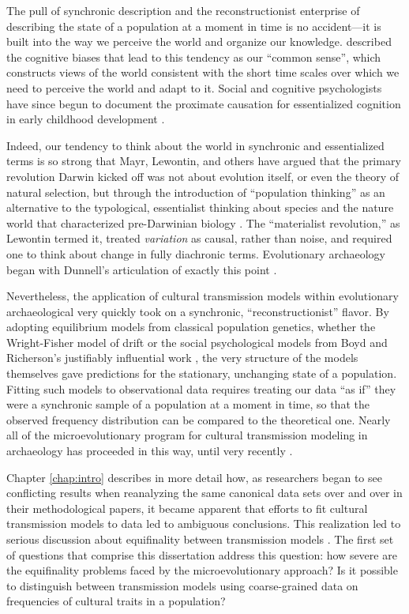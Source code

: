 The pull of synchronic description and the reconstructionist enterprise of describing the state of a population at a moment in time is no accident---it is built into the way we perceive the world and organize our knowledge.   \citet{dunnell1982harvey} described the cognitive biases that lead to this tendency as our ``common sense'', which constructs views of the world consistent with the short time scales over which we need to perceive the world and adapt to it.  Social and cognitive psychologists have since begun to document the proximate causation for essentialized cognition in early childhood development .  

Indeed, our tendency to think about the world in synchronic and essentialized terms is so strong that Mayr, Lewontin, and others have argued that the primary revolution Darwin kicked off was not about evolution itself, or even the theory of natural selection, but through the introduction of ``population thinking'' as an alternative to the typological, essentialist thinking about species and the nature world that characterized pre-Darwinian biology \citep{dunnell1982harvey,lewontin1974darwin,Mayr1959typological}.  The ``materialist revolution,'' as Lewontin termed it, treated \emph{variation} as causal, rather than noise, and required one to think about change in fully diachronic terms.  Evolutionary archaeology began with Dunnell's articulation of exactly this point \citep{Dunnell1978,Dunnell1980,dunnell1982harvey,Dunnell1989}.  

Nevertheless, the application of cultural transmission models within evolutionary archaeological very quickly took on a synchronic, ``reconstructionist'' flavor.  By adopting equilibrium models from classical population genetics, whether the Wright-Fisher model of drift or the social psychological models from Boyd and Richerson's justifiably influential work \citeyearpar{BR1985}, the very structure of the models themselves gave predictions for the stationary, unchanging state of a population.  Fitting such models to observational data requires treating our data ``as if'' they were a synchronic sample of a population at a moment in time, so that the observed frequency distribution can be compared to the theoretical one.  Nearly all of the microevolutionary program for cultural  transmission modeling in archaeology has proceeded in this way, until very recently \citep{Kandler2013}. 

Chapter \ref{chap:intro} describes in more detail how, as researchers began to see conflicting results when reanalyzing the same canonical data sets over and over in their methodological papers, it became apparent that efforts to fit cultural transmission models to data led to ambiguous conclusions.  This realization led to serious discussion about equifinality between transmission models \citep{barrett2019equifinality,kandler2019analysing,premo2010equifinality}.  The first set of questions that comprise this dissertation address this question:  how severe are  the equifinality problems faced by the microevolutionary approach?  Is it possible to distinguish between transmission models using coarse-grained data on frequencies of cultural traits in a population?

